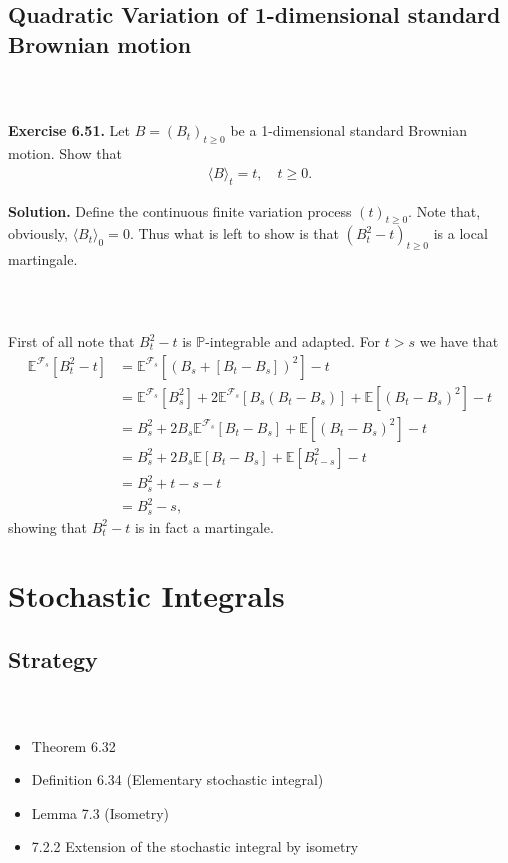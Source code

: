 \documentclass{beamer}
\numberwithin{equation}{section}
\newenvironment{frame2}{\begin{frame}\frametitle{{\normalsize \secname} \\ {\large \subsecname}}}{\end{frame}}
\begin{document}
\subsection{Quadratic Variation of 1-dimensional standard Brownian motion}

\begin{frame2}
    \textbf{Exercise 6.51.}
    Let $B=(B_t)_{t\geq 0}$ be a 1-dimensional standard Brownian motion.
    Show that
    \begin{align}
        \langle B \rangle_t = t, \quad t\geq 0.
    \end{align}
    
    \vspace{10pt}
    \textbf{Solution.}
    Define the continuous finite variation process $(t)_{t\geq 0}$. 
    Note that, obviously, $\langle B_t \rangle_0 = 0$.
    Thus what is left to show is that $(B_t^2-t)_{t\geq 0}$ is a local martingale.
\end{frame2}

\begin{frame2}
    First of all note that $B_t^2-t$ is $\mathbb{P}$-integrable and adapted.
    For $t > s$ we have that
    \begin{align*}
        \mathbb{E}^{\mathcal{F}_s}\left[B_t^2-t\right]&= \mathbb{E}^{\mathcal{F}_s}\left[(B_s+[B_t-B_s])^2\right]-t \\
        &= \mathbb{E}^{\mathcal{F}_s}\left[B_s^2\right] +2\mathbb{E}^{\mathcal{F}_s}[B_s(B_t-B_s)] + \mathbb{E}\left[(B_t-B_s)^2\right]-t \\
        &=B_s^2 + 2B_s \mathbb{E}^{\mathcal{F}_s}[B_t-B_s]+\mathbb{E}\left[(B_t-B_s)^2\right]-t \\
        &= B_s^2+2B_s\mathbb{E}[B_t-B_s]+\mathbb{E}\left[B_{t-s}^2\right]-t \\
        &=B_s^2 + t - s - t \\
        &= B_s^2 - s,
    \end{align*}
    showing that $B_t^2-t$ is in fact a martingale.
\end{frame2}

\section{Stochastic Integrals}

\subsection{Strategy}
\begin{frame2}
    \begin{itemize}
        \item Theorem 6.32
        \item Definition 6.34 (Elementary stochastic integral)
        \item Lemma 7.3 (Isometry)
        \item 7.2.2 Extension of the stochastic integral by isometry
    \end{itemize}
\end{frame2}
\end{document}
